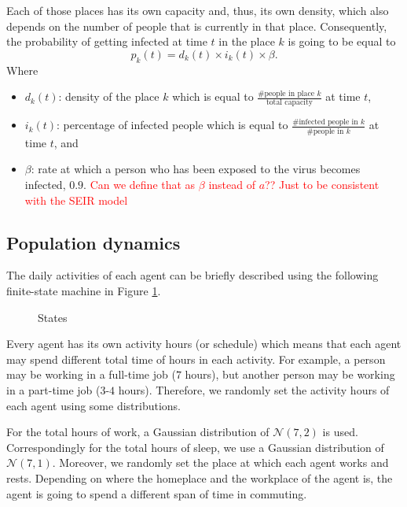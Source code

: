 \documentclass[a4paper]{article}
\begin{document}
Each of those places has its own capacity and, thus, its own density, which also depends on the number of people that is currently in that place. Consequently, the probability of getting infected at time $t$ in the place $k$ is going to be equal to $$p_k(t) = d_k(t) \times i_k(t) \times \beta.$$ Where
\begin{itemize}
\item $d_k(t)$: density of the place $k$ which is equal to $\frac{\#\text{people in place }k}{\text{total capacity}}$ at time $t$,
\item $i_k(t)$: percentage of infected people which is equal to $\frac{\#\text{infected people in }k}{\#\text{people in }k}$ at time $t$, and
\item $\beta$: rate at which a person who has been exposed to the virus becomes infected, $0.9$. \textcolor{red}{Can we define that as $\beta$ instead of $a$?? Just to be consistent with the SEIR model}
\end{itemize}
 
\subsection{Population dynamics}
The daily activities of each agent can be briefly described using the following finite-state machine in Figure \ref{states}. 

\begin{figure}[H]
\centering
{}
\caption{States}
\label{states}
\end{figure}
Every agent has its own activity hours (or schedule) which means that each agent may spend different total time of hours in each activity. For example, a person may be working in a full-time job ($7$ hours), but another person may be working in a part-time job ($3$-$4$ hours). Therefore, we randomly set the activity hours of each agent using some distributions. 

For the total hours of work, a Gaussian distribution of $\mathcal{N}(7,2)$ is used. Correspondingly for the total hours of sleep, we use a Gaussian distribution of $\mathcal{N}(7,1)$. Moreover, we randomly set the place at which each agent works and rests. Depending on where the homeplace and the workplace of the agent is, the agent is going to spend a different span of time in commuting. 
\end{document}
